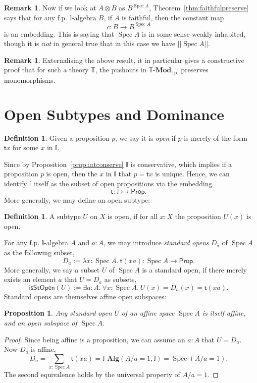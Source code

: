 \documentclass[12pt]{amsart}
\newtheorem{proposition}[theorem]{Proposition}
\theoremstyle{definition}
\newtheorem{definition}[theorem]{Definition}
\newtheorem{remark}[theorem]{Remark}
\newcommand{\mb}[1]{\mathbf{#1}}
\newcommand{\mbb}[1]{\mathbb{#1}}
\newcommand{\T}{\mbb T}
\newcommand{\I}{\mbb I}
\newcommand{\mr}[1]{\mathrm{#1}}
\newcommand{\ms}[1]{\mathsf{#1}}
\newcommand{\alg}{\text{-}\mb{Alg}}
\newcommand{\inj}{\rightarrowtail}
\newcommand{\fp}{_{\mr{f.p.}}}
\newcommand{\fa}[2]{\forall #1\!\colon\!\!#2.\ }
\newcommand{\ex}[2]{\exists #1\!\colon\!\!#2.\ }
\newcommand{\ld}[2]{\lambda #1\!\colon\!\!#2.\ }
\newcommand{\pss}[1]{||#1||} %
\newcommand{\pp}{\ms{Prop}}
\newcommand{\mmod}[1]{#1\text{-}\mathbf{Mod}}
\newcommand{\spec}{\operatorname{Spec}}
\begin{document}
\begin{remark}
  Now if we look at $A \otimes B$ as $B^{\spec A}$, Theorem~\ref{thm:faithfulpreserve} says that for any f.p. $\I$-algebra $B$, if $A$ is faithful, then the constant map
  \[ c : B \to B^{\spec A} \]
  is an embedding. This is saying that $\spec A$ is in some sense weakly inhabited, though it is \emph{not} in general true that in this case we have $\pss{\spec A}$.
\end{remark}

\begin{remark}
  Externalising the above result, it in particular gives a constructive proof that for such a theory $\T$, the pushouts in $\mmod\T\fp$ preserves monomorphisms.
\end{remark}

\section{Open Subtypes and Dominance}

\begin{definition}
  Given a proposition $p$, we say it is \emph{open} if $p$ is merely of the form $\ms tx$ for some $x$ in $\I$.
\end{definition}

Since by Proposition~\ref{prop:intconserve} $\I$ is conservative, which implies if a proposition $p$ is open, then the $x$ in $\I$ that $p = \ms tx$ is unique. Hence, we can identify $\I$ itself as the subset of open propositions via the embedding
\[ \ms t : \I \inj \pp. \]
More generally, we may define an open subtype:

\begin{definition}
  A subtype $U$ on $X$ is open, if for all $x:X$ the proposition $U(x)$ is open.
\end{definition}

For any f.p. $\I$-algebra $A$ and $a : A$, we may introduce \emph{standard opens} $D_a$ of $\spec A$ as the following subset,
\[ D_a := \ld{x}{\spec A} \ms t(xa) : \spec A \to \pp. \]
More generally, we say a subset $U$ of $\spec A$ is a standard open, if there merely exists an element $a$ that $U = D_a$ as subsets,
\[ \ms{isStOpen}(U) := \ex aA \fa x{\spec A} U(x) = D_a(x) = \ms t(xa). \]
Standard opens are themselves affine open subspaces:

\begin{proposition}\label{prop:standardaffine}
  Any standard open $U$ of an affine space $\spec A$ is itself affine, and an open subspace of $\spec A$.
\end{proposition}
\begin{proof}
  Since being affine is a proposition, we can assume an $a : A$ that $U = D_a$. Now $D_a$ is affine,
  \[ D_a = \sum_{x:\spec A}\ms t(xa) = \I\alg(A/a=1,\I) = \spec(A/a=1). \]
  The second equivalence holds by the universal property of $A/a=1$.
\end{proof}
\end{document}
